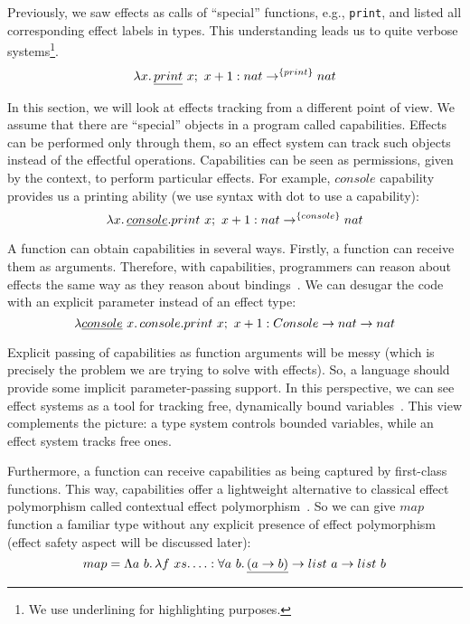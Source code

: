 \documentclass[conference]{IEEEtran}
\newcommand{\seq}{;~}
\newcommand{\ap}{~}
\begin{document}
    Previously, we saw effects as calls of ``special'' functions, e.g., \texttt{print}, and listed all corresponding effect labels in types.
    This understanding leads us to quite verbose systems\footnote{We use underlining for highlighting purposes.}.
    \[\lambda x\ldotp \underline{print}\ap x\seq x + 1 : nat \to^{\{print\}} nat\]

    In this section, we will look at effects tracking from a different point of view.
    We assume that there are ``special'' objects in a program called capabilities.
    Effects can be performed only through them, so an effect system can track such objects instead of the effectful operations.
    Capabilities can be seen as permissions, given by the context, to perform particular effects.
    For example, $console$ capability provides us a printing ability (we use syntax with dot to use a capability):
    \[\lambda x\ldotp \underline{console}.print\ap x\seq x + 1 : nat \to^{\{console\}} nat\]


    A function can obtain capabilities in several ways.
    Firstly, a function can receive them as arguments.
    Therefore, with capabilities, programmers can reason about effects the same way as they reason about bindings~\cite{brachthauser2022effects}.
    We can desugar the code with an explicit parameter instead of an effect type:
    \[\lambda \underline{console} \ap x \ldotp console.print\ap x\seq x + 1 : Console \to nat \to nat\]

    Explicit passing of capabilities as function arguments will be messy (which is precisely the problem we are trying to solve with effects).
    So, a language should provide some implicit parameter-passing support.
    In this perspective, we can see effect systems as a tool for tracking free, dynamically bound variables~\cite{odersky2022scoped}.
    This view complements the picture: a type system controls bounded variables, while an effect system tracks free ones.

    Furthermore, a function can receive capabilities as being captured by first-class functions.
    This way, capabilities offer a lightweight alternative to classical effect polymorphism called contextual effect polymorphism~\cite{brachthauser2022effects}.
    So we can give $map$ function a familiar type without any explicit presence of effect polymorphism (effect safety aspect will be discussed later):
    \[map = \Lambda a \ap b\ldotp \lambda f\ap xs\ldotp \ldots : \forall a \ap b\ldotp \underline{(a \to b)} \to list \ap a \to list \ap b \]
\end{document}
